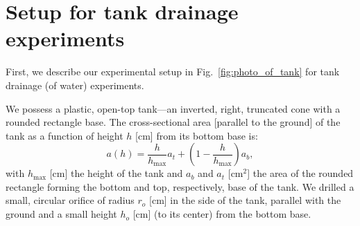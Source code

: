 \documentclass[openacc]{rsproca_new}%
\begin{document}
%




\section{Setup for tank drainage experiments} \label{sec:expt}
First, we describe our experimental setup in Fig.~\ref{fig:photo_of_tank} for tank drainage (of water) experiments.

We possess a plastic, open-top tank---an inverted, right, truncated cone with a rounded rectangle base. 
The cross-sectional area [parallel to the ground] of the tank as a function of height $h$ [cm] from its bottom base is:
\begin{equation}
	a(h) = \frac{h}{h_{\text{max}}}a_t + \left(1-\frac{h}{h_{\text{max}}}\right) a_b, \label{eq:a_of_h}
\end{equation}
with $h_{\text{max}}$ [cm] the height of the tank and $a_b$ and $a_t$ [cm$^2$] the area of the rounded rectangle forming the bottom and top, respectively, base of the tank.
We drilled a small, circular orifice of radius $r_o$ [cm] in the side of the tank, parallel with the ground and a small height $h_o$ [cm] (to its center) from the bottom base.
\end{document}
